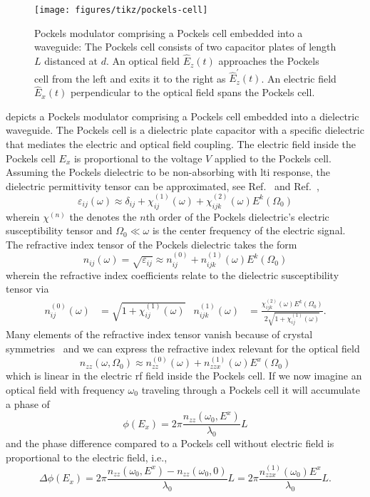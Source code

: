 \begin{figure}[htb]
    \centering
    \texttt{[image: figures/tikz/pockels-cell]}
    \caption{Pockels modulator comprising a Pockels cell embedded into a waveguide: The Pockels cell consists of two capacitor plates of length $L$ distanced at $d$. An optical field $\hat{E}_z(t)$ approaches the Pockels cell from the left and exits it to the right as $\hat{E}_z^\prime(t)$. An electric field $\hat{E}_x(t)$ perpendicular to the optical field spans the Pockels cell.}\label{fig:pm}
\end{figure}
 depicts a Pockels modulator comprising a Pockels cell embedded into a dielectric waveguide.
The Pockels cell is a dielectric plate capacitor with a specific dielectric that mediates the electric and optical field coupling.
The electric field inside the Pockels cell $E_x$ is proportional to the voltage $V$ applied to the Pockels cell.
Assuming the Pockels dielectric to be non-absorbing with \gls{lti} response, the dielectric permittivity tensor can be approximated, see Ref.~\cite{Murti2014} and Ref.~\cite[p.~1070]{Mandel1995},
\begin{equation}
	\varepsilon_{ij}(\omega)
	\approx
	\delta_{ij}
	+
	\chi_{ij}^{(1)}(\omega)
	+
	\chi_{ijk}^{(2)}(\omega)
	E^k(\Omega_0)
\end{equation}
wherein $\chi^{(n)}$ the denotes the $n$th order of the Pockels dielectric's electric susceptibility tensor and $\Omega_0\ll\omega$ is the center frequency of the electric signal.
The refractive index tensor of the Pockels dielectric takes the form
\begin{equation}
	n_{ij}(\omega)
	=
	\sqrt{\varepsilon_{ij}}
	\approx
	n_{ij}^{(0)}
	+
	n_{ijk}^{(1)}(\omega)
	E^k(\Omega_0)
\end{equation}
wherein the refractive index coefficients relate to the dielectric susceptibility tensor via~\cite{Rerat2020}
\begin{align}
	n^{(0)}_{ij}(\omega)
	&=
	\sqrt{1+\chi^{(1)}_{ij}(\omega)}
	&
	n^{(1)}_{ijk}(\omega)
	&=
	\frac{\chi^{(2)}_{ijk}(\omega)
	E^k(\Omega_0)}{2\sqrt{1+\chi^{(1)}_{ij}(\omega)}}
	.
\end{align}
Many elements of the refractive index tensor vanish because of crystal symmetries~\cite[p.~237]{Yariv1984} and we can express the refractive index relevant for the optical field
\begin{equation}
	n_{zz}(\omega,\Omega_0)
	\approx
	n^{(0)}_{zz}(\omega)
	+
	n^{(1)}_{zzx}(\omega)
	E^x(\Omega_0)
\end{equation}
which is linear in the electric \gls{rf} field inside the Pockels cell.
If we now imagine an optical field with frequency $\omega_0$ traveling through a Pockels cell it will accumulate a phase of
\begin{equation}
	\phi(E_x)
	=
	2\pi\frac{n_{zz}(\omega_0,E^x)}{\lambda_0}L
\end{equation} 
and the phase difference compared to a Pockels cell without electric field is proportional to the electric field, i.e.,
\begin{equation}
	\Delta\phi(E_x)
	=
	2\pi\frac{n_{zz}(\omega_0,E^x)-n_{zz}(\omega_0,0)}{\lambda_0}L
	=
	2\pi\frac{n_{zzx}^{(1)}(\omega_0)E^x}{\lambda_0}L
	.
\end{equation}

